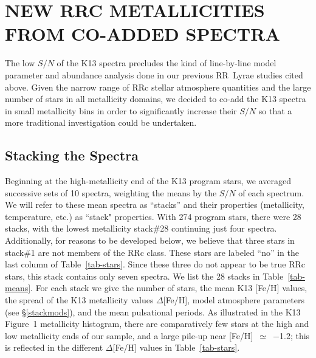 \documentclass[preprint]{aastex6}
\begin{document}
\section{NEW RRC METALLICITIES FROM CO-ADDED SPECTRA}\label{stackanal}

The low $S/N$ of the K13 spectra precludes the kind of line-by-line model 
parameter and abundance analysis done in our previous RR~Lyrae studies cited
above.
Given the narrow range of RRc stellar atmosphere quantities and the large 
number of stars in all metallicity domains, we decided to co-add the K13
spectra in small metallicity bins in order to significantly increase their
$S/N$ so that a more traditional investigation could be undertaken.


\subsection{Stacking the Spectra}\label{makestack}

Beginning at the high-metallicity end of the K13 program stars, we averaged 
successive sets of 10 spectra, weighting the means by the $S/N$ of 
each spectrum.
We will refer to these mean spectra as ``stacks'' and their 
properties (metallicity, temperature, etc.) as ``stack" properties.
With 274 program stars, there were 28 stacks, with the lowest
metallicity stack\#28 continuing just four spectra.  
Additionally, for reasons to be developed below, we believe that three
stars in stack\#1 are not members of the RRc class.
These stars are labeled ``no'' in the last column of Table~\ref{tab-stars}.
Since these three do not appear to be true RRc stars, 
this stack contains only seven spectra.
We list the 28 stacks in Table~\ref{tab-means}. 
For each stack we give the number of stars, the mean K13 [Fe/H] values, the 
spread of the K13 metallicity values $\Delta$[Fe/H], model atmosphere 
parameters (see \S\ref{stackmods}), and the mean pulsational periods.
As illustrated in the K13 Figure~1 metallicity histogram, there
are comparatively few stars at the high and low metallicity ends of our
sample, and a large pile-up near [Fe/H]~$\simeq$~$-$1.2; 
this is reflected in
the different $\Delta$[Fe/H] values in Table~\ref{tab-stars}.
\end{document}
